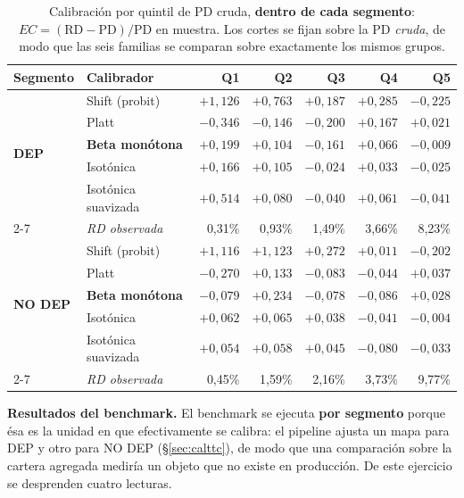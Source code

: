 \documentclass[12pt, a4paper]{article}
\newcommand{\PD}{\ensuremath{\mathrm{PD}}}
\newcommand{\RD}{\ensuremath{\mathrm{RD}}}
\begin{document}
\begin{table}[H]
\centering
\caption{Calibración por quintil de PD cruda, \textbf{dentro de cada segmento}: $EC=(\RD-\PD)/\PD$ en muestra. Los cortes se fijan sobre la PD \emph{cruda}, de modo que las seis familias se comparan sobre exactamente los mismos grupos.}
\label{tab:quintiles}
\scriptsize
\begin{tabular}{llrrrrr}
\toprule
\textbf{Segmento} & \textbf{Calibrador} & \textbf{Q1} & \textbf{Q2} & \textbf{Q3} & \textbf{Q4} & \textbf{Q5} \\
\midrule
\multirow{5}{*}{\textbf{DEP}}
 & Shift (probit)        & $+1{,}126$ & $+0{,}763$ & $+0{,}187$ & $+0{,}285$ & $-0{,}225$ \\
 & Platt                 & $-0{,}346$ & $-0{,}146$ & $-0{,}200$ & $+0{,}167$ & $+0{,}021$ \\
 & \textbf{Beta monótona}& $+0{,}199$ & $+0{,}104$ & $-0{,}161$ & $+0{,}066$ & $-0{,}009$ \\
 & Isotónica             & $+0{,}166$ & $+0{,}105$ & $-0{,}024$ & $+0{,}033$ & $-0{,}025$ \\
 & Isotónica suavizada   & $+0{,}514$ & $+0{,}080$ & $-0{,}040$ & $+0{,}061$ & $-0{,}041$ \\
\cmidrule(lr){2-7}
 & \emph{RD observada}   & 0,31\% & 0,93\% & 1,49\% & 3,66\% & 8,23\% \\
\midrule
\multirow{5}{*}{\textbf{NO DEP}}
 & Shift (probit)        & $+1{,}116$ & $+1{,}123$ & $+0{,}272$ & $+0{,}011$ & $-0{,}202$ \\
 & Platt                 & $-0{,}270$ & $+0{,}133$ & $-0{,}083$ & $-0{,}044$ & $+0{,}037$ \\
 & \textbf{Beta monótona}& $-0{,}079$ & $+0{,}234$ & $-0{,}078$ & $-0{,}086$ & $+0{,}028$ \\
 & Isotónica             & $+0{,}062$ & $+0{,}065$ & $+0{,}038$ & $-0{,}041$ & $-0{,}004$ \\
 & Isotónica suavizada   & $+0{,}054$ & $+0{,}058$ & $+0{,}045$ & $-0{,}080$ & $-0{,}033$ \\
\cmidrule(lr){2-7}
 & \emph{RD observada}   & 0,45\% & 1,59\% & 2,16\% & 3,73\% & 9,77\% \\
\bottomrule
\end{tabular}
\end{table}

\noindent\textbf{Resultados del benchmark.} El benchmark se ejecuta
\textbf{por segmento} porque ésa es la unidad en que efectivamente se calibra: el pipeline ajusta un
mapa para DEP y otro para NO DEP (\S\ref{sec:calttc}), de modo que una comparación sobre la cartera
agregada mediría un objeto que no existe en producción. De este ejercicio se desprenden cuatro
lecturas.
\end{document}
